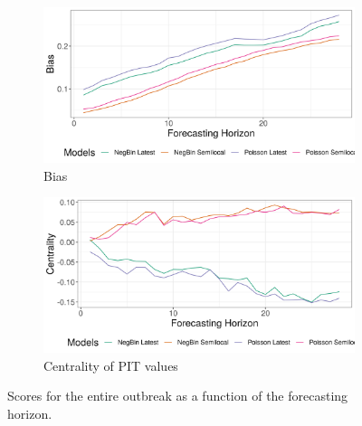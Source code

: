 \begin{figure}[H]
\begin{subfigure}{0.5\textwidth}
  \centering
  \includegraphics[width=\linewidth]{../output/Mabalako_bias.png}  
  \caption{Bias}
  \label{fig:sub-third}
\end{subfigure}
\begin{subfigure}{0.5\textwidth}
  \centering
  \includegraphics[width=\linewidth]{../output/Mabalako_centrality.png}  
  \caption{Centrality of PIT values}
  \label{fig:nat_scores_4}
\end{subfigure}
  \caption{Scores for the entire outbreak as a function of the forecasting horizon.}

  \label{fig:nat_scores}
\end{figure}

